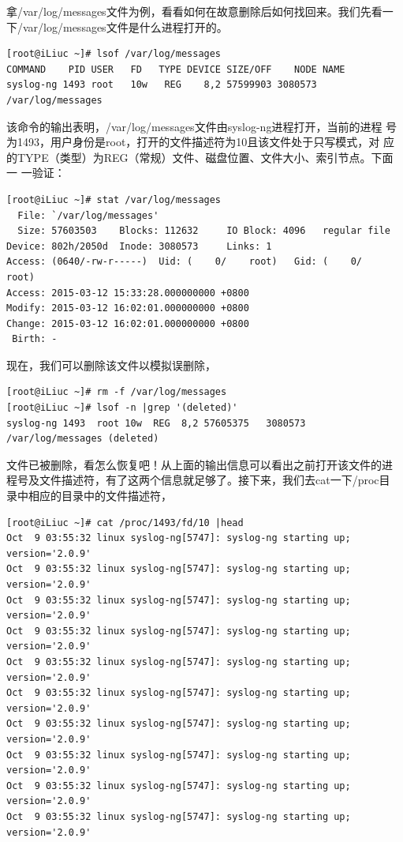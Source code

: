 拿/var/log/messages文件为例，看看如何在故意删除后如何找回来。我们先看一
下/var/log/messages文件是什么进程打开的。

\begin{verbatim}
[root@iLiuc ~]# lsof /var/log/messages 
COMMAND    PID USER   FD   TYPE DEVICE SIZE/OFF    NODE NAME
syslog-ng 1493 root   10w   REG    8,2 57599903 3080573 /var/log/messages
\end{verbatim}

该命令的输出表明，/var/log/messages文件由syslog-ng进程打开，当前的进程
号为1493，用户身份是root，打开的文件描述符为10且该文件处于只写模式，对
应的TYPE（类型）为REG（常规）文件、磁盘位置、文件大小、索引节点。下面一
一验证：

\begin{verbatim}
[root@iLiuc ~]# stat /var/log/messages 
  File: `/var/log/messages'
  Size: 57603503  	Blocks: 112632     IO Block: 4096   regular file
Device: 802h/2050d	Inode: 3080573     Links: 1
Access: (0640/-rw-r-----)  Uid: (    0/    root)   Gid: (    0/    root)
Access: 2015-03-12 15:33:28.000000000 +0800
Modify: 2015-03-12 16:02:01.000000000 +0800
Change: 2015-03-12 16:02:01.000000000 +0800
 Birth: -
\end{verbatim}

现在，我们可以删除该文件以模拟误删除，

\begin{verbatim}
[root@iLiuc ~]# rm -f /var/log/messages
[root@iLiuc ~]# lsof -n |grep '(deleted)'
syslog-ng 1493  root 10w  REG  8,2 57605375   3080573 /var/log/messages (deleted)
\end{verbatim}

文件已被删除，看怎么恢复吧！从上面的输出信息可以看出之前打开该文件的进
程号及文件描述符，有了这两个信息就足够了。接下来，我们去cat一下/proc目
录中相应的目录中的文件描述符，

\begin{verbatim}
[root@iLiuc ~]# cat /proc/1493/fd/10 |head
Oct  9 03:55:32 linux syslog-ng[5747]: syslog-ng starting up; version='2.0.9'
Oct  9 03:55:32 linux syslog-ng[5747]: syslog-ng starting up; version='2.0.9'
Oct  9 03:55:32 linux syslog-ng[5747]: syslog-ng starting up; version='2.0.9'
Oct  9 03:55:32 linux syslog-ng[5747]: syslog-ng starting up; version='2.0.9'
Oct  9 03:55:32 linux syslog-ng[5747]: syslog-ng starting up; version='2.0.9'
Oct  9 03:55:32 linux syslog-ng[5747]: syslog-ng starting up; version='2.0.9'
Oct  9 03:55:32 linux syslog-ng[5747]: syslog-ng starting up; version='2.0.9'
Oct  9 03:55:32 linux syslog-ng[5747]: syslog-ng starting up; version='2.0.9'
Oct  9 03:55:32 linux syslog-ng[5747]: syslog-ng starting up; version='2.0.9'
Oct  9 03:55:32 linux syslog-ng[5747]: syslog-ng starting up; version='2.0.9'
\end{verbatim}

